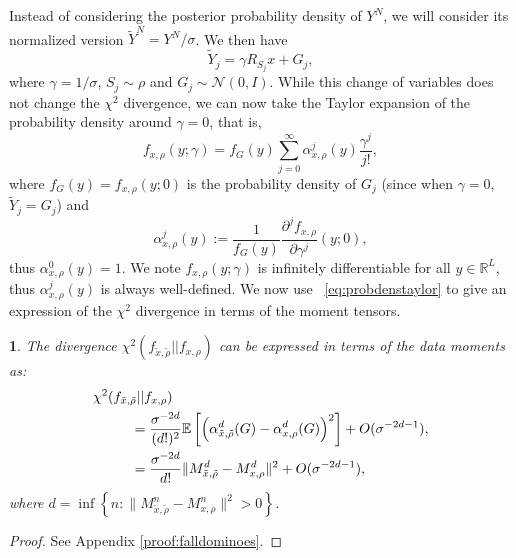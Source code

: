 \documentclass{IEEEtran}
\numberwithin{equation}{section}
\numberwithin{figure}{section}
\theoremstyle{plain}
\theoremstyle{definition}
\theoremstyle{remark}
\theoremstyle{plain}
\newtheorem{lem}[thm]{\protect\lemmaname}
\theoremstyle{remark}
\theoremstyle{plain}
\theoremstyle{plain}
\theoremstyle{remark}
\providecommand{\lemmaname}{Lemma}
\newcommand{\RL}{\mathbb{R}^L}
\newcommand{\E}{\mathbb{E}}
\newcommand{\N}{{\mathcal{N}}}
\newcommand{\OO}{{O}}
\newcommand{\error}{G}
\begin{document}
Instead of considering the posterior probability density of $Y^N$, we will consider its normalized version $\widetilde Y^N=Y^N/\sigma$. We then have
\begin{equation}\label{eq:tildey}
\widetilde Y_j=\gamma R_{S_j} x + \error_j,
\end{equation}
where $\gamma=1/\sigma$, $S_j\sim \rho$ and $\error_j\sim \N(0,I)$. While this change of variables does not change the $\chi^2$ divergence, we can now take the Taylor expansion of the probability density around $\gamma=0$, that is,
\begin{equation}\label{eq:probdenstaylor}
f_{x,\rho}(y;\gamma)=f_\error(y)\sum_{j=0}^\infty \alpha^j_{x,\rho}(y)\frac{\gamma^j}{j!},
\end{equation}
\smallskip where $f_\error(y)=f_{x,\rho}(y;0)$ is the probability density of $\error_j$ (since when $\gamma=0$, $\widetilde Y_j=\error_j$) and
\begin{equation}\label{eq:alpha}
\alpha^j_{x,\rho}(y):=\frac1{f_\error(y)}\frac{\partial^j f_{x,\rho}}{\partial \gamma^j}(y;0),
\end{equation}
thus $\alpha^0_{x,\rho}(y)=1$. We note $f_{x,\rho}(y;\gamma)$ is infinitely differentiable for all $y\in \RL$, thus $\alpha^j_{x,\rho}(y)$ is always well-defined. We now use ~\eqref{eq:probdenstaylor} to give an expression of the $\chi^2$ divergence in terms of the moment tensors.

\begin{lem}\label{lem:falldominoes} 
	The divergence $\chi^2(f_{\tilde x,\tilde \rho}||f_{x,\rho})$ can be expressed in terms of the data moments as:
	\begin{align}
	\nonumber \chi^2(f_{\tilde x,\tilde \rho}||f_{x,\rho})\hspace{-30pt}&\\
	&=\frac{\sigma^{-2d}}{(d!)^2}\E\left[\left(\alpha_{\tilde x,\tilde \rho}^d(\error)-\alpha_{x,\rho}^d(\error)\right)^2\right]+\OO(\sigma^{-2d-1}), \label{eq:falldominoes}\\
	&=\frac{\sigma^{-2d}}{d!}\|M^d_{\tilde x,\tilde \rho}-M^d_{x,\rho}\|^2+\OO(\sigma^{-2d-1}), \label{eq:chi2autocorr}
	\end{align}
	where $d=\inf\left\{n:\|M^n_{\tilde x,\tilde \rho}-M^n_{x,\rho}\|^2>0\right\}$.
\end{lem}

\begin{proof}
	See Appendix \ref{proof:falldominoes}.
\end{proof}
\end{document}

